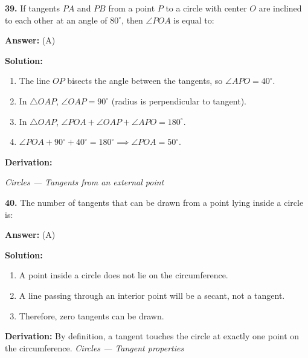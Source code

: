 \documentclass[12pt,a4paper]{exam}
\newcommand{\fitmath}[1]{%
  \sbox{\schmathbox}{$\displaystyle #1$}%
  \ifdim\wd\schmathbox>\linewidth
    \resizebox{\linewidth}{!}{\usebox{\schmathbox}}%
  \else
    \usebox{\schmathbox}%
  \fi}
\begin{document}
\begin{questions}
\question \textbf{39.} If tangents $PA$ and $PB$ from a point $P$ to a circle with center $O$ are inclined to each other at an angle of $80^\circ$, then $\angle POA$ is equal to:

\textbf{Answer:}
(A)

\textbf{Solution:}
\begin{enumerate}
  \item The line $OP$ bisects the angle between the tangents, so $\angle APO = 40^\circ$.
  \item In $\triangle OAP$, $\angle OAP = 90^\circ$ (radius is perpendicular to tangent).
  \item In $\triangle OAP$, $\angle POA + \angle OAP + \angle APO = 180^\circ$.
  \item $\angle POA + 90^\circ + 40^\circ = 180^\circ \implies \angle POA = 50^\circ$.
\end{enumerate}
\textbf{Derivation:}
\begin{center}
\fitmath{\angle POA = 180^\circ - 90^\circ - 40^\circ = 50^\circ}
\end{center}
\hfill \textit{Circles — Tangents from an external point}
\vspace{0.3cm}

\question \textbf{40.} The number of tangents that can be drawn from a point lying inside a circle is:

\textbf{Answer:}
(A)

\textbf{Solution:}
\begin{enumerate}
  \item A point inside a circle does not lie on the circumference.
  \item A line passing through an interior point will be a secant, not a tangent.
  \item Therefore, zero tangents can be drawn.
\end{enumerate}
\textbf{Derivation:}
By definition, a tangent touches the circle at exactly one point on the circumference.
\hfill \textit{Circles — Tangent properties}
\vspace{0.3cm}

\end{questions}
\end{document}
